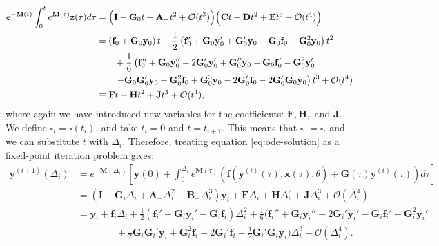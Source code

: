 \begin{equation}
\begin{split}
    e^{-\mathbf{M}(t)}\int_{0}^t e^{\mathbf{M}(\tau)} \mathbf{z}(\tau) d \tau & = \Bigl(\mathbf{I} - \mathbf{G}_0t+\mathbf{A}_{-}t^2 + \mathcal{O}(t^3)\Bigr) \Bigl(\mathbf{C}t + \mathbf{D}t^2 + \mathbf{E}t^3 + \mathcal{O}(t^4)\Bigr) \\
    & = \left(\mathbf{f}_0+\mathbf{G}_0\mathbf{y}_0\right)t+\frac{1}{2}\left(\mathbf{f}_0'+\mathbf{G}_0\mathbf{y}_0'+\mathbf{G}_0'\mathbf{y}_0  -\mathbf{G}_0\mathbf{f}_0-\mathbf{G}_0^2\mathbf{y}_0\right)t^2 \\
    & \qquad +\frac{1}{6}\left(\mathbf{f}_0''+\mathbf{G}_0\mathbf{y}_0''+2\mathbf{G}_0'\mathbf{y}_0'+\mathbf{G}_0''\mathbf{y}_0 -\mathbf{G}_0\mathbf{f}_0'-\mathbf{G}_0^2\mathbf{y}_0' \right. \\
    & \qquad \left. -\mathbf{G}_0\mathbf{G}_0'\mathbf{y}_0+\mathbf{G}_0^2\mathbf{f}_0 +\mathbf{G}_0^3\mathbf{y}_0-2\mathbf{G}_0'\mathbf{f}_0-2\mathbf{G}_0'\mathbf{G}_0\mathbf{y}_0\right)t^3 + \mathcal{O}(t^4) \\
    & \equiv \mathbf{F}t + \mathbf{H}t^2 + \mathbf{J}t^3 + \mathcal{O}(t^4),
\end{split}
\end{equation}
where again we have introduced new variables for the coefficients: $\mathbf{F}, \mathbf{H},$ and $\mathbf{J}$. We define $\square_i = \square(t_i)$, and take $t_i = 0$ and $t = t_{i+1}$.  This means that $\square_0=\square_i$ and we can substitute $t$ with $\Delta_i$. Therefore, treating equation \ref{eq:ode-solution} as a fixed-point iteration problem gives:
\begin{equation}
\begin{split}
    \mathbf{y}^{(i+1)}(\Delta_i) 
    & = e^{-\mathbf{M}(\Delta_i)}\left[\mathbf{y}(0)+\int_{0}^{\Delta_i} e^{\mathbf{M}(\tau)} \left(\mathbf{f}(\mathbf{y}^{(i)}(\tau), \mathbf{x}(\tau), \theta)+\mathbf{G}(\tau)\mathbf{y}^{(i)}(\tau) \right) d \tau\right] \\
    & = \left(\mathbf{I} - \mathbf{G}_i\Delta_i + \mathbf{A}_{-}\Delta_i^2 - \mathbf{B}_{-}\Delta_i^3 \right)\mathbf{y}_i + \mathbf{F}\Delta_i + \mathbf{H}\Delta_i^2 + \mathbf{J}\Delta_i^3 + \mathcal{O}(\Delta_i^4) \\
    & = \mathbf{y}_i + \mathbf{f}_i \Delta_i + \frac{1}{2}\left(\mathbf{f}_i'+\mathbf{G}_i\mathbf{y}_i'-\mathbf{G}_i\mathbf{f}_i\right)\Delta_i^2 + \frac{1}{6}\biggl(\mathbf{f}_i''+\mathbf{G}_i\mathbf{y}_i''+2\mathbf{G}_i'\mathbf{y}_i'-\mathbf{G}_i\mathbf{f}_i'-\mathbf{G}_i^2\mathbf{y}_i' \\
    & \qquad \qquad  + \frac{1}{2}\mathbf{G}_i\mathbf{G}_i'\mathbf{y}_i+\mathbf{G}_i^2\mathbf{f}_i - 2\mathbf{G}_i'\mathbf{f}_i-\frac{1}{2}\mathbf{G}_i'\mathbf{G}_i\mathbf{y}_i\biggr)\Delta_i^3 + \mathcal{O}(\Delta_i^4).
\end{split} 
\end{equation}
